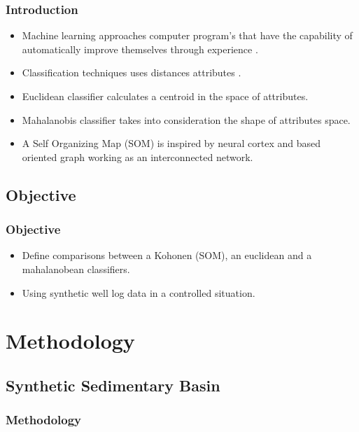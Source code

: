 \documentclass[aspectratio=10]{beamer} %
\begin{document}
\begin{frame}
\frametitle{Introduction}

\begin{itemize}
	\item Machine learning approaches computer program's that have the capability of automatically improve themselves through experience \citep{Michie1994, Levy1997, MacKay2005}.
	\pause
	\item Classification techniques uses distances attributes \citep{Michel2016}.
	\pause
	\item Euclidean classifier calculates a centroid in the space of attributes.
	\pause
	\item Mahalanobis classifier takes into consideration the shape of attributes space.
	\pause
	\item A Self Organizing Map (SOM) is inspired by neural cortex \citep{Kohonen1989} and based oriented graph \citep{Haykin1999} working as an interconnected network. 
	
\end{itemize}

\end{frame}

\subsection{Objective}

\begin{frame}
\frametitle{Objective}
	\begin{itemize}
		\item Define comparisons between a Kohonen (SOM), an euclidean and a mahalanobean classifiers.
		\pause
		\item Using synthetic well log data in a controlled situation.
	\end{itemize}
\end{frame}


\section{Methodology}

\subsection{Synthetic Sedimentary Basin}




\begin{frame}
	\frametitle{Methodology}
\end{frame}
\end{document}
